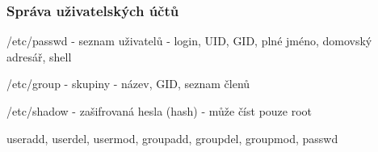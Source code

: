 \subsubsection*{Správa uživatelských účtů}

\begin{pitemize}
  \item /etc/passwd - seznam uživatelů - login, UID, GID, plné jméno, domovský adresář, shell
  \item /etc/group - skupiny - název, GID, seznam členů
  \item /etc/shadow - zašifrovaná hesla (hash) - může číst pouze root
  \item useradd, userdel, usermod, groupadd, groupdel, groupmod, passwd
\end{pitemize}
